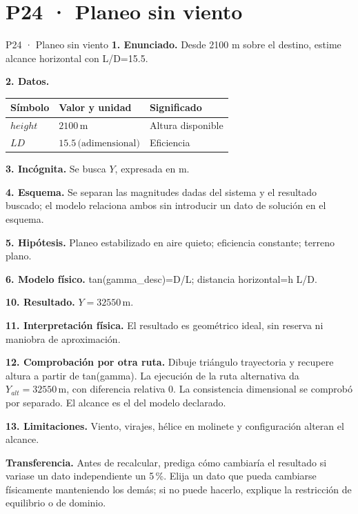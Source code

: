\chapter*{P24 · Planeo sin viento}
\begin{studiumworked}{P24 · Planeo sin viento}
\textbf{1. Enunciado.} Desde 2100 m sobre el destino, estime alcance horizontal con L/D=15.5.

\textbf{2. Datos.}
\begin{longtable}{p{.16\linewidth}p{.35\linewidth}p{.38\linewidth}}\toprule Símbolo & Valor y unidad & Significado\\\midrule\endhead
$height$ & $2100\,\mathrm m$ & Altura disponible\\
$LD$ & $15.5\,\text{(adimensional)}$ & Eficiencia\\
\bottomrule\end{longtable}
\textbf{3. Incógnita.} Se busca $Y$, expresada en $\mathrm m$.

\textbf{4. Esquema.} Se separan las magnitudes dadas del sistema y el resultado buscado; el modelo relaciona ambos sin introducir un dato de solución en el esquema.

\textbf{5. Hipótesis.} Planeo estabilizado en aire quieto; eficiencia constante; terreno plano.

\textbf{6. Modelo físico.} tan(gamma\_desc)=D/L; distancia horizontal=h L/D.


\textbf{10. Resultado.} $Y=32550\,\mathrm m$.

\textbf{11. Interpretación física.} El resultado es geométrico ideal, sin reserva ni maniobra de aproximación.

\textbf{12. Comprobación por otra ruta.} Dibuje triángulo trayectoria y recupere altura a partir de tan(gamma). La ejecución de la ruta alternativa da $Y_{alt}=32550\,\mathrm m$, con diferencia relativa $0$. La consistencia dimensional se comprobó por separado. El alcance es el del modelo declarado.

\textbf{13. Limitaciones.} Viento, virajes, hélice en molinete y configuración alteran el alcance.

\textbf{Transferencia.} Antes de recalcular, prediga cómo cambiaría el resultado si variase un dato independiente un 5\,\%. Elija un dato que pueda cambiarse físicamente manteniendo los demás; si no puede hacerlo, explique la restricción de equilibrio o de dominio.\par
\end{studiumworked}
